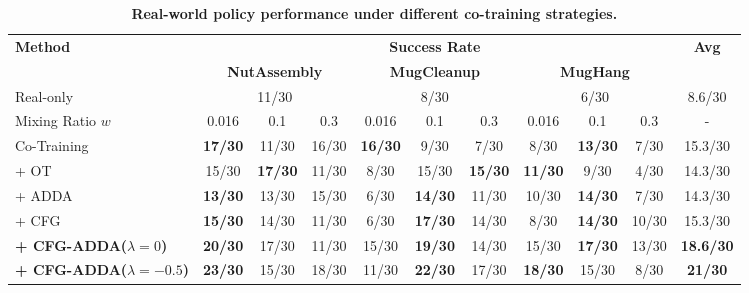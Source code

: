 \begin{table}[t]
\centering
\small
\setlength{\tabcolsep}{6pt}
\begin{tabular}{l ccc ccc ccc c}
\toprule
\multirow{2}{*}{\textbf{Method}} 
& \multicolumn{9}{c}{\textbf{Success Rate}} 
& \multirow{2}{*}{\textbf{Avg}} \\
\cmidrule(lr){2-10}
& \multicolumn{3}{c}{\textbf{NutAssembly}} 
& \multicolumn{3}{c}{\textbf{MugCleanup}} 
& \multicolumn{3}{c}{\textbf{MugHang}} 
&  \\
\cmidrule(lr){2-4} \cmidrule(lr){5-7} \cmidrule(lr){8-10}

Real-only
& \multicolumn{3}{c}{11/30}
& \multicolumn{3}{c}{8/30}
& \multicolumn{3}{c}{6/30}
& 8.6/30 \\

\midrule
Mixing Ratio $w$
& 0.016 & 0.1 & 0.3
& 0.016 & 0.1 & 0.3
& 0.016 & 0.1 & 0.3
& - \\

\midrule
Co-Training
& \cellcolor{ylog}\textbf{17/30} & 11/30 & 16/30
& \cellcolor{ylog}\textbf{16/30} & 9/30 & 7/30
& 8/30 & \cellcolor{ylog}\textbf{13/30} & 7/30
& 15.3/30 \\

\midrule
\quad + OT
& 15/30 & \cellcolor{ylog}\textbf{17/30} & 11/30
& 8/30 & 15/30 & \cellcolor{ylog}\textbf{15/30}
& \cellcolor{ylog}\textbf{11/30} & 9/30 & 4/30
& 14.3/30 \\

\quad + ADDA
& \cellcolor{ylog}\textbf{13/30} & 13/30 & 15/30
& 6/30 & \cellcolor{ylog}\textbf{14/30} & 11/30
& 10/30 & \cellcolor{ylog}\textbf{14/30} & 7/30
& 14.3/30 \\

\quad + CFG
& \cellcolor{ylog}\textbf{15/30} & 14/30 & 11/30
& 6/30 & \cellcolor{ylog}\textbf{17/30} & 14/30
& 8/30 & \cellcolor{ylog}\textbf{14/30} & 10/30
& 15.3/30 \\

\midrule
\textbf{+ CFG-ADDA($\lambda=0$)}
& \cellcolor{ylog}\textbf{20/30} & 17/30 & 11/30
& 15/30 & \cellcolor{ylog}\textbf{19/30} & 14/30
& 15/30 & \cellcolor{ylog}\textbf{17/30} & 13/30
& \cellcolor{ylog}\textbf{18.6/30} \\

\textbf{+ CFG-ADDA($\lambda=-0.5$)}
& \cellcolor{ylog}\textbf{23/30} & 15/30 & 18/30
& 11/30 & \cellcolor{ylog}\textbf{22/30} & 17/30
& \cellcolor{ylog}\textbf{18/30} & 15/30 & 8/30
& \cellcolor{ylog}\textbf{21/30} \\

\bottomrule
\end{tabular}
\caption{
\textbf{Real-world policy performance under different co-training strategies.}
}
\label{tab: real_world_eval}
\vspace{-10pt}
\end{table}

